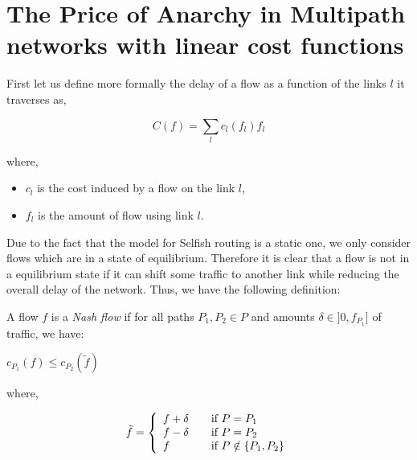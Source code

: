 \section{The Price of Anarchy in Multipath networks with linear cost functions}

\label{sect:linearanarchy}

First let us define more formally the delay of a flow as a function of the links $l$ it traverses as,

\begin{equation}
 C(f) = \displaystyle\sum\limits_{l} c_{l}(f_{l})f_{l}
\label{eq:costflow}
\end{equation}

where,

\begin{itemize}
 \item $c_{l}$ is the cost induced by a flow on the link $l$,
 \item $f_{l}$ is the amount of flow using link $l$.
\end{itemize}

Due to the fact that the model for Selfish routing is a static one, we only consider flows which are in a state of equilibrium. Therefore it is clear that a flow is not in a equilibrium state if it can shift some traffic to another link while reducing the overall delay of the network. Thus, we have the following definition:

\begin{definition}
  A flow $f$ is a \emph{Nash flow} if for all paths $P_{1}, P_{2} \in P$ and amounts $\delta \in ]0,f_{P_{1}}]$ of traffic, we have:
  \begin{center}
   $c_{P_{1}}(f) \leq c_{P_{2}}(\tilde{f})$\\
  \end{center}
   where,
  \begin{center}
  \[\tilde{f} = \left\{ 
    \begin{array}{l l}
	f + \delta & \quad \mbox{if $P = P_{1}$}\\
	f - \delta & \quad \mbox{if $P = P_{2}$}\\ 
	f & \quad \mbox{if $P \notin \{P_{1}, P_{2}\}$}\\   
    \end{array} \right. \]
  \end{center}
  \label{def:nashflow}
\end{definition}

